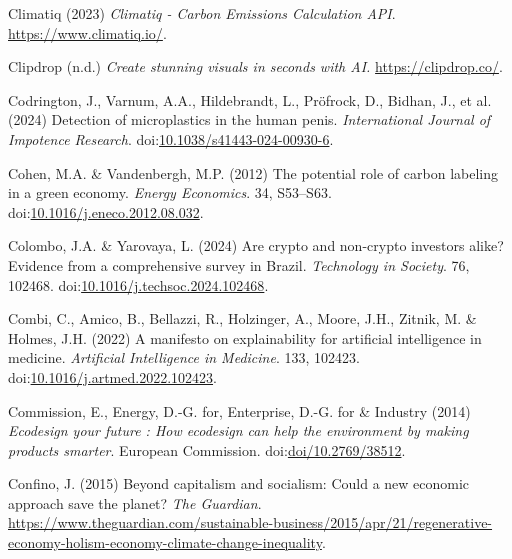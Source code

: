 \documentclass[
  letterpaper,
  DIV=11,
  numbers=noendperiod]{scrartcl}
\newlength{\cslhangindent}
\newenvironment{CSLReferences}[2] %
 {\begin{list}{}{%
  \setlength{\itemindent}{0pt}
  \setlength{\leftmargin}{0pt}
  \setlength{\parsep}{0pt}
  \ifodd #1
   \setlength{\leftmargin}{\cslhangindent}
   \setlength{\itemindent}{-1\cslhangindent}
  \fi
  \setlength{\itemsep}{#2\baselineskip}}}
 {\end{list}}
\begin{document}
\begin{CSLReferences}{0}{1}
Climatiq (2023) \emph{Climatiq - {Carbon Emissions Calculation API}}.
\url{https://www.climatiq.io/}.

Clipdrop (n.d.) \emph{Create stunning visuals in seconds with {AI}.}
\url{https://clipdrop.co/}.

Codrington, J., Varnum, A.A., Hildebrandt, L., Pröfrock, D., Bidhan, J.,
et al. (2024) Detection of microplastics in the human penis.
\emph{International Journal of Impotence Research}.
doi:\href{https://doi.org/10.1038/s41443-024-00930-6}{10.1038/s41443-024-00930-6}.

Cohen, M.A. \& Vandenbergh, M.P. (2012) The potential role of carbon
labeling in a green economy. \emph{Energy Economics}. 34, S53--S63.
doi:\href{https://doi.org/10.1016/j.eneco.2012.08.032}{10.1016/j.eneco.2012.08.032}.

Colombo, J.A. \& Yarovaya, L. (2024) Are crypto and non-crypto investors
alike? {Evidence} from a comprehensive survey in {Brazil}.
\emph{Technology in Society}. 76, 102468.
doi:\href{https://doi.org/10.1016/j.techsoc.2024.102468}{10.1016/j.techsoc.2024.102468}.

Combi, C., Amico, B., Bellazzi, R., Holzinger, A., Moore, J.H., Zitnik,
M. \& Holmes, J.H. (2022) A manifesto on explainability for artificial
intelligence in medicine. \emph{Artificial Intelligence in Medicine}.
133, 102423.
doi:\href{https://doi.org/10.1016/j.artmed.2022.102423}{10.1016/j.artmed.2022.102423}.

Commission, E., Energy, D.-G. for, Enterprise, D.-G. for \& Industry
(2014) \emph{Ecodesign your future : How ecodesign can help the
environment by making products smarter}. European Commission.
doi:\href{https://doi.org/doi/10.2769/38512}{doi/10.2769/38512}.

Confino, J. (2015) Beyond capitalism and socialism: Could a new economic
approach save the planet? \emph{The Guardian}.
\url{https://www.theguardian.com/sustainable-business/2015/apr/21/regenerative-economy-holism-economy-climate-change-inequality}.


\end{CSLReferences}
\end{document}

